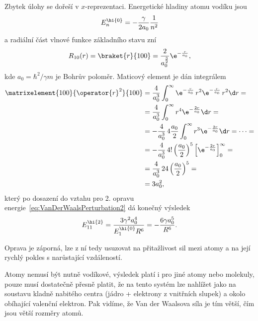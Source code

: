 \begin{solution}
	Zbytek úlohy se dořeší v $x$-reprezentaci.
	Energetické hladiny atomu vodíku jsou
	\begin{equation}
		E_{n}^{\hi{0}}=-\frac{\gamma}{2a_{0}}\frac{1}{n^{2}}
	\end{equation}
	a radiální část vlnové funkce základního stavu zní
	\begin{equation}
		\label{eq:HydrogenR10}
		R_{10}(r)=\braket{r}{100}=\frac{2}{a_{0}^{\frac{3}{2}}}\e^{-\frac{r}{a_{0}}},
	\end{equation}
	kde $a_{0}=\hbar^{2}/\gamma m$ je Bohrův poloměr.
	Maticový element je dán integrálem
	\begin{align}
		\matrixelement{100}{\operator{r}^{2}}{100}
		&=\frac{4}{a_{0}^{3}}\int_{0}^{\infty}\e^{-\frac{r}{a_{0}}}\,r^{2}\e^{-\frac{r}{a_{0}}}\,r^{2}\d r=\nonumber\\
		&=\frac{4}{a_{0}^{3}}\int_{0}^{\infty}r^{4}\e^{-\frac{2r}{a_{0}}}\d r=\nonumber\\
		&=-\frac{4}{a_{0}^{3}}\,4\frac{a_{0}}{2}\int_{0}^{\infty}r^{3}\e^{-\frac{2r}{a_{0}}}\d r=\dotsb=\nonumber\\
		&=-\frac{4}{a_{0}^{3}}\,4!\left(\frac{a_{0}}{2}\right)^{5}\left[\e^{-\frac{2r}{a_{0}}}\right]_{0}^{\infty}=\nonumber\\
		&=\frac{4}{a_{0}^{3}}\,24\left(\frac{a_{0}}{2}\right)^{5}=\nonumber\\
		&=3a_{0}^{2},
	\end{align}
	který po dosazení do vztahu pro 2. opravu energie~\eqref{eq:VanDerWaalsPerturbation2} dá konečný výsledek
	\begin{equation}
		E_{11}^{\hi{2}}=\frac{3\gamma^{2}a_{0}^{4}}{E_{1}^{\hi{0}}R^{6}}=-\frac{6\gamma a_{0}^{5}}{R^{6}}.
	\end{equation}

	Oprava je záporná, lze z ní tedy usuzovat na přitažlivost sil mezi atomy a na její rychlý pokles s narůstající vzdáleností.

	Atomy nemusí být nutně vodíkové, výsledek platí i pro jiné atomy nebo molekuly,
	pouze musí dostatečně přesně platit, že na tento systém lze nahlížet jako na soustavu kladně nabitého centra 
	(jádro + elektrony z vnitřních slupek) a okolo obíhající valenční elektron.
	Pak vidíme, že Van der Waalsova síla je tím větší, čím jsou větší rozměry atomů.


\end{solution}
